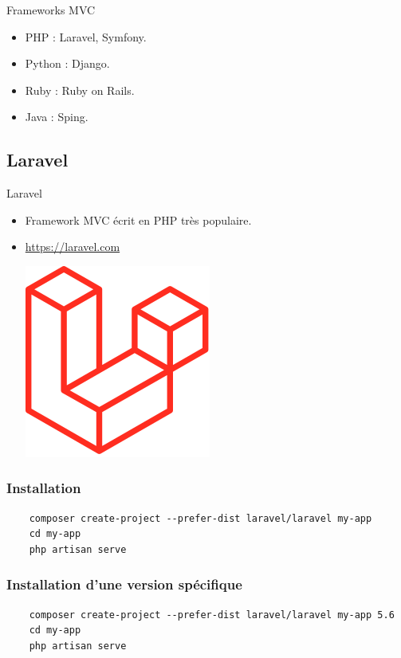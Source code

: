 \documentclass{beamer}
\begin{document}
\begin{frame}{Frameworks MVC}
\begin{itemize}
  \item PHP : Laravel, Symfony.
  \item Python : Django.
  \item Ruby : Ruby on Rails.
  \item Java : Sping.
\end{itemize}
\end{frame}

\subsection{Laravel}
\begin{frame}{Laravel}
\begin{itemize}
  \item Framework MVC écrit en PHP très populaire.
  \item \url{https://laravel.com}
    \vspace{10pt}
    \begin{center}
      \includegraphics[scale=0.3]{images/laravel.png}
    \end{center}
\end{itemize}
\end{frame}

\begin{frame}[fragile]
\frametitle{Installation}
\begin{footnotesize}
  \begin{Verbatim}
    composer create-project --prefer-dist laravel/laravel my-app
    cd my-app
    php artisan serve
  \end{Verbatim}
\end{footnotesize}
\end{frame}

\begin{frame}[fragile]
\frametitle{Installation d'une version spécifique}
\begin{footnotesize}
  \begin{Verbatim}
    composer create-project --prefer-dist laravel/laravel my-app 5.6
    cd my-app
    php artisan serve
  \end{Verbatim}
\end{footnotesize}
\end{frame}
\end{document}
